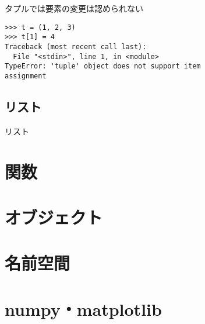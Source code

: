 \documentclass[12pt, xetex, xcolor=pdftex, dvipsnames]{beamer}
\begin{document}
\begin{frame}[fragile]
    \alert{タプルでは要素の変更は認められない}
\begin{lstlisting}
>>> t = (1, 2, 3)
>>> t[1] = 4
Traceback (most recent call last):
  File "<stdin>", line 1, in <module>
TypeError: 'tuple' object does not support item
assignment
\end{lstlisting}
\end{frame}

\subsection{リスト}
\begin{frame}[fragile]{リスト}

\end{frame}

\section{関数}

\section{オブジェクト}

\section{名前空間}

\section{numpy・matplotlib}
\end{document}
